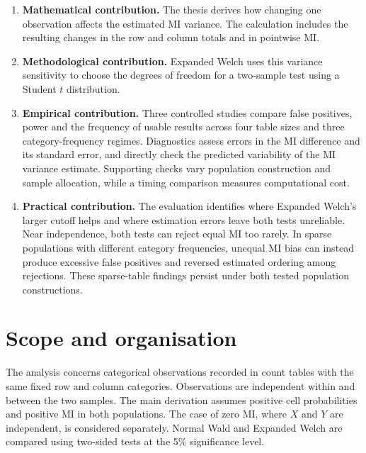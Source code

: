 \begin{enumerate}
  \item \begin{samepage}\textbf{Mathematical contribution.} The thesis derives how changing
  one observation affects the estimated MI variance. The calculation includes
  the resulting changes in the row and column totals and in pointwise MI.
  \par
  \end{samepage}

  \item \begin{samepage}\textbf{Methodological contribution.} Expanded Welch uses this
  variance sensitivity to choose the degrees of freedom for a two-sample
  test using a Student \(t\) distribution.
  \par
  \end{samepage}

  \item \begin{samepage}\textbf{Empirical contribution.} Three controlled studies compare
  false positives, power and the frequency of usable results across
  four table sizes and three category-frequency regimes. Diagnostics
  assess errors in the MI difference and its standard error, and directly
  check the predicted variability of the MI variance estimate. Supporting
  checks vary population construction and sample allocation, while a
  timing comparison measures computational cost.
  \par
  \end{samepage}

  \item \textbf{Practical contribution.} The evaluation identifies
  where Expanded Welch's larger cutoff helps and where estimation errors
  leave both tests unreliable. Near independence, both tests can reject
  equal MI too rarely. In sparse populations with different category
  frequencies, unequal MI bias can instead produce excessive false
  positives and reversed estimated ordering among rejections. These
  sparse-table findings persist under both tested population constructions.
\end{enumerate}

\section{Scope and organisation}

The analysis concerns categorical observations recorded in count tables
with the same fixed row and column categories. Observations are independent
within and between the two samples. The main derivation assumes positive
cell probabilities and positive MI in both populations. The case of zero MI,
where \(X\) and \(Y\) are independent, is considered separately.
Normal Wald and Expanded Welch are compared using two-sided tests at the
5\% significance level.

